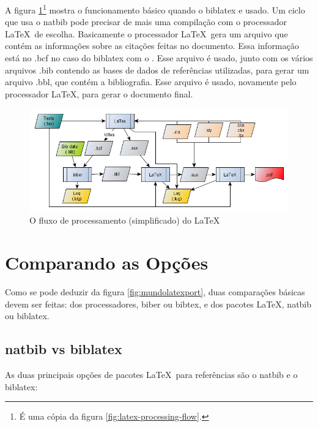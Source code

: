 A figura \ref{fig:latex-processing-flow2}\footnote{É uma cópia da figura \ref{fig:latex-processing-flow}.} mostra o funcionamento básico quando o biblatex e usado. Um ciclo que usa o natbib pode precisar de mais uma compilação com o processador \LaTeX\  de escolha. Basicamente o processador \LaTeX\   gera um arquivo que contém as informações sobre as citações feitas no documento. Essa informação está no .bcf no caso do biblatex com o . Esse arquivo é usado, junto com os vários arquivos .bib contendo as bases de dados de referências utilizadas, para gerar um arquivo .bbl, que contém a bibliografia. Esse arquivo é usado, novamente pelo processador \LaTeX, para gerar o documento final. 


\begin{figure}[hbt]
    \centering
    \includegraphics[width=0.8\linewidth]{"Images/LaTeX processing flow"}
    \caption{O fluxo de processamento (simplificado) do \LaTeX}
    \label{fig:latex-processing-flow2}
\end{figure}

\section{Comparando as Opções}

Como se pode deduzir da figura \ref{fig:mundolatexport}, duas comparações básicas devem ser feitas: dos processadores, biber ou bibtex, e dos pacotes \LaTeX, natbib ou biblatex.

\subsection{natbib vs biblatex}

As duas principais opções de pacotes \LaTeX\    
para referências são o natbib e o biblatex\parencite{biber:2012}:

